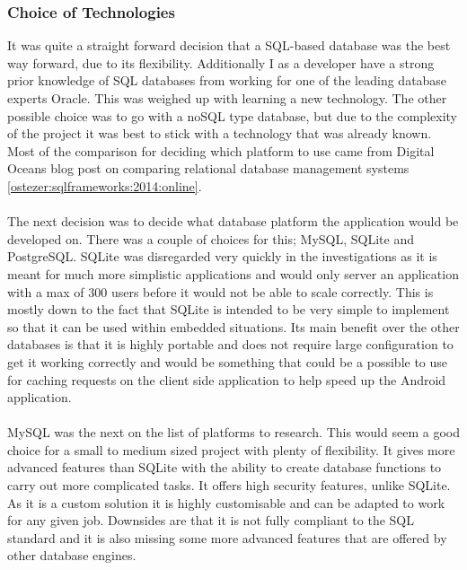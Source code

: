\subsubsection{Choice of Technologies}
\label{sec:database_choice_of_tech}
 
It was quite a straight forward decision that a SQL-based database was the best way forward, due to its flexibility. Additionally I as a developer have a strong prior knowledge of SQL databases from working for one of the leading database experts Oracle. This was weighed up with learning a new technology. The other possible choice was to go with a noSQL type database, but due to the complexity of the project it was best to stick with a technology that was already known. Most of the comparison for deciding which platform to use came from Digital Oceans blog post on comparing relational database management systems \ref{ostezer:sqlframeworks:2014:online}.\\
\\
The next decision was to decide what database platform the application would be developed on. There was a couple of choices for this; MySQL, SQLite and PostgreSQL. SQLite was disregarded very quickly in the investigations as it is meant for much more simplistic applications and would only server an application with a max of 300 users before it would not be able to scale correctly. This is mostly down to the fact that SQLite is intended to be very simple to implement so that it can be used within embedded situations. Its main benefit over the other databases is that it is highly portable and does not require large configuration to get it working correctly and would be something that could be a possible to use for caching requests on the client side application to help speed up the Android application.\\
\\
MySQL was the next on the list of platforms to research. This would seem a good choice for a small to medium sized project with plenty of flexibility. It gives more advanced features than SQLite with the ability to create database functions to carry out more complicated tasks. It offers high security features, unlike SQLite. As it is a custom solution it is highly customisable and can be adapted to work for any given job. Downsides are that it is not fully compliant to the SQL standard and it is also missing some more advanced features that are offered by other database engines.\\
\\
